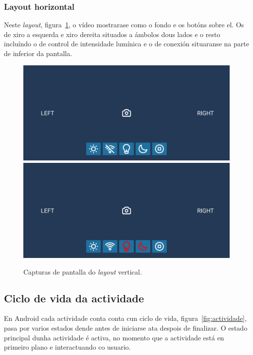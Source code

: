 \subsubsection{Layout horizontal}
Neste \emph{layout}, figura~\ref{fig:layout_vertical}, o vídeo mostrarase como o fondo e os botóns sobre el. Os de xiro a esquerda e xiro dereita situados a ámbolos dous lados e o resto incluíndo o de control de intensidade lumínica e o de conexión situaranse na parte de inferior da pantalla.
\begin{figure}[tb]
  \centering
  \includegraphics[scale=.1]{imaxes/layout-horizontal1.png}
  \includegraphics[scale=.1]{imaxes/layout-horizontal2.png}
  \caption{Capturas de pantalla do \emph{layout} vertical.}
  \label{fig:layout_vertical}
\end{figure}
\subsection{Ciclo de vida da actividade}
En Android cada actividade conta conta cun ciclo de vida, figura~\ref{fig:actividade}, pasa por varios estados dende antes de iniciarse ata despois de finalizar. O estado principal dunha actividade é activa, no momento que a actividade está en primeiro plano e interactuando co usuario.

